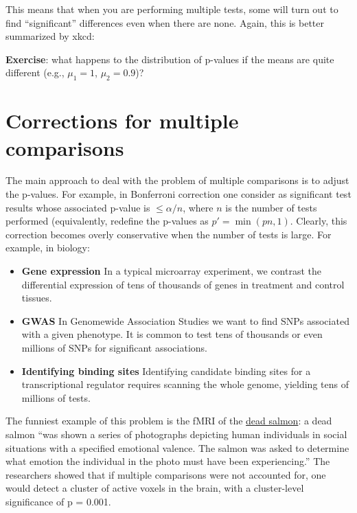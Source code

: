\documentclass[
  letterpaper,
  DIV=11,
  numbers=noendperiod]{scrreprt}
\begin{document}
This means that when you are performing multiple tests, some will turn
out to find ``significant'' differences even when there are none. Again,
this is better summarized by xkcd:

\textbf{Exercise}: what happens to the distribution of p-values if the
means are quite different (e.g., \(\mu_1 = 1\), \(\mu_2 = 0.9\))?

\hypertarget{corrections-for-multiple-comparisons}{%
\section{Corrections for multiple
comparisons}\label{corrections-for-multiple-comparisons}}

The main approach to deal with the problem of multiple comparisons is to
adjust the p-values. For example, in Bonferroni correction one consider
as significant test results whose associated p-value is
\(\leq \alpha / n\), where \(n\) is the number of tests performed
(equivalently, redefine the p-values as \(p' = \min(p n, 1)\). Clearly,
this correction becomes overly conservative when the number of tests is
large. For example, in biology:

\begin{itemize}
\item
  \textbf{Gene expression} In a typical microarray experiment, we
  contrast the differential expression of tens of thousands of genes in
  treatment and control tissues.
\item
  \textbf{GWAS} In Genomewide Association Studies we want to find SNPs
  associated with a given phenotype. It is common to test tens of
  thousands or even millions of SNPs for significant associations.
\item
  \textbf{Identifying binding sites} Identifying candidate binding sites
  for a transcriptional regulator requires scanning the whole genome,
  yielding tens of millions of tests.
\end{itemize}

The funniest example of this problem is the fMRI of the
\href{http://prefrontal.org/files/posters/Bennett-Salmon-2009.pdf}{dead
salmon}: a dead salmon ``was shown a series of photographs depicting
human individuals in social situations with a specified emotional
valence. The salmon was asked to determine what emotion the individual
in the photo must have been experiencing.'' The researchers showed that
if multiple comparisons were not accounted for, one would detect a
cluster of active voxels in the brain, with a cluster-level significance
of p = 0.001.
\end{document}
